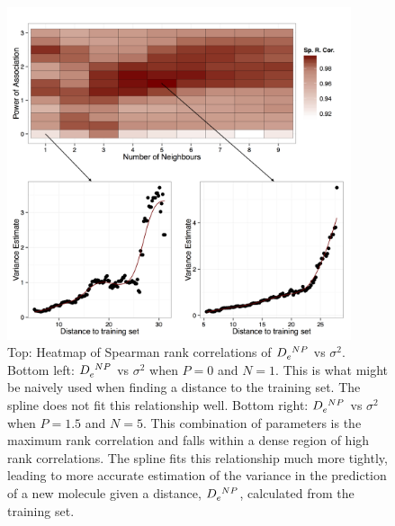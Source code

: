 \documentclass[10pt]{bmc_article}
\newenvironment{bmcformat}{\begin{raggedright}\baselineskip20pt\sloppy\setboolean{publ}{false}}{\end{raggedright}\baselineskip20pt\sloppy}
\begin{document}
\begin{bmcformat}
\begin{figure}[ht]
  \centering
  \includegraphics[width=0.9\textwidth]{./Figures/error_estimation.png}
  \caption{Top: Heatmap of Spearman rank correlations of $\tensor{D}{_e^N^P}$ vs $\sigma^2$. Bottom left: $\tensor{D}{_e^N^P}$ vs $\sigma^2$ when $P=0$ and $N=1$. This is what might be naively used when finding a distance to the training set. The spline does not fit this relationship well. Bottom right: $\tensor{D}{_e^N^P}$ vs $\sigma^2$ when $P=1.5$ and $N=5$. This combination of parameters is the maximum rank correlation and falls within a dense region of high rank correlations. The spline fits this relationship much more tightly, leading to more accurate estimation of the variance in the prediction of a new molecule given a distance, $\tensor{D}{_e^N^P}$, calculated from the training set.}
  \label{fig:error_estimation}
\end{figure}


\end{bmcformat}
\end{document}
